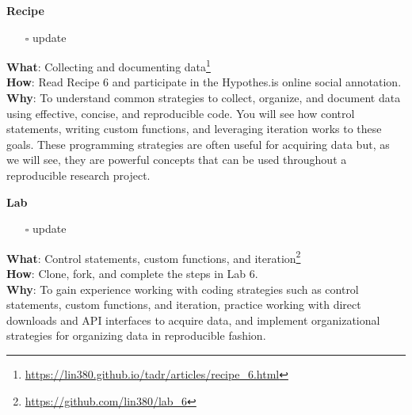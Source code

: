 \documentclass[
  letterpaper,
  DIV=11,
  numbers=noendperiod]{scrreport}
\providecommand{\tightlist}{%
  \setlength{\itemsep}{0pt}\setlength{\parskip}{0pt}}\usepackage{longtable,booktabs,array}
\theoremstyle{definition}
\theoremstyle{remark}
\DeclareRobustCommand{\href}[2]{#2\footnote{\url{#1}}}
\begin{document}
\begin{tcolorbox}[enhanced jigsaw, opacityback=0, bottomrule=.15mm, left=2mm, breakable, colback=white, leftrule=.75mm, toprule=.15mm, rightrule=.15mm, arc=.35mm]

\textbf{ Recipe}

\begin{itemize}
\tightlist
\item[$\square$]
   update
\end{itemize}

\textbf{What}:
\href{https://lin380.github.io/tadr/articles/recipe_6.html}{Collecting
and documenting data}\\
\textbf{How}: Read Recipe 6 and participate in the Hypothes.is online
social annotation.\\
\textbf{Why}: To understand common strategies to collect, organize, and
document data using effective, concise, and reproducible code. You will
see how control statements, writing custom functions, and leveraging
iteration works to these goals. These programming strategies are often
useful for acquiring data but, as we will see, they are powerful
concepts that can be used throughout a reproducible research project.

\end{tcolorbox}

\begin{tcolorbox}[enhanced jigsaw, opacityback=0, bottomrule=.15mm, left=2mm, breakable, colback=white, leftrule=.75mm, toprule=.15mm, rightrule=.15mm, arc=.35mm]

\textbf{ Lab}

\begin{itemize}
\tightlist
\item[$\square$]
   update
\end{itemize}

\textbf{What}: \href{https://github.com/lin380/lab_6}{Control
statements, custom functions, and iteration}\\
\textbf{How}: Clone, fork, and complete the steps in Lab 6.\\
\textbf{Why}: To gain experience working with coding strategies such as
control statements, custom functions, and iteration, practice working
with direct downloads and API interfaces to acquire data, and implement
organizational strategies for organizing data in reproducible fashion.

\end{tcolorbox}
\end{document}
